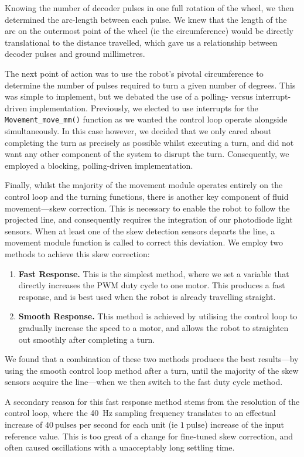 \documentclass[conference]{IEEEtran}
\begin{document}
Knowing the number of decoder pulses in one full rotation of the wheel, we then determined the arc-length between each pulse. We knew that the length of the arc on the outermost point of the wheel (ie the circumference) would be directly translational to the distance travelled, which gave us a relationship between decoder pulses and ground millimetres.

The next point of action was to use the robot's pivotal circumference to determine the number of pulses required to turn a given number of degrees.
This was simple to implement, but we debated the use of a polling- versus interrupt-driven implementation.
Previously, we elected to use interrupts for the \texttt{Movement\_move\_mm()} function as we wanted the control loop operate alongside simultaneously.
In this case however, we decided that we only cared about completing the turn as precisely as possible whilst executing a turn, and did not want any other component of the system to disrupt the turn.
Consequently, we employed a blocking, polling-driven implementation.

Finally, whilst the majority of the movement module operates entirely on the control loop and the turning functions, there is another key component of fluid movement—skew correction.
This is necessary to enable the robot to follow the projected line, and consequently requires the integration of our photodiode light sensors.
When at least one of the skew detection sensors departs the line, a movement module function is called to correct this deviation.
We employ two methods to achieve this skew correction:
\begin{enumerate}
	\item \textbf{Fast Response.}
	      This is the simplest method, where we set a variable that directly increases the PWM duty cycle to one motor.
	      This produces a fast response, and is best used when the robot is already travelling straight.
	\item \textbf{Smooth Response.}
	      This method is achieved by utilising the control loop to gradually increase the speed to a motor, and allows the robot to straighten out smoothly after completing a turn.
\end{enumerate}
We found that a combination of these two methods produces the best results—by using the smooth control loop method after a turn, until the majority of the skew sensors acquire the line—when we then switch to the fast duty cycle method.

A secondary reason for this fast response method stems from the resolution of the control loop, where the \qty{40}{\hertz} sampling frequency translates to an effectual increase of $\qty{40}{\text{pulses}}$ per second for each unit (ie $\qty{1}{\text{pulse}}$) increase of the input reference value.
This is too great of a change for fine-tuned skew correction, and often caused oscillations with a unacceptably long settling time.
\end{document}
